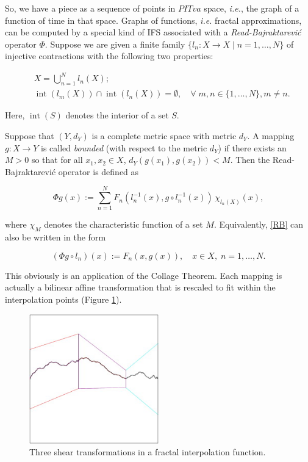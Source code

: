 \documentclass[english,11pt,letterpaper,onecolumn]{scrartcl}
\numberwithin{equation}{section}
\newcommand{\Int}{\mathop{\mathrm{int}}}
\newcommand{\be}{\begin{equation}}
\newcommand{\ee}{\end{equation}}
\begin{document}
So, we have a piece as a sequence of points in $PITva$ space, \textit{i.e.}, 
the graph of a function of time in that space. Graphs of functions, 
\textit{i.e.} fractal approximations, can be computed by a special kind of IFS 
associated with a \textit{Read-Bajraktarevi\'c} operator $\Phi$. Suppose we 
are given a finite family $\{l_n : X\to X \mid n = 1, \ldots, N\}$ of 
injective contractions with the following two properties: 

\begin{align}
&X = \bigcup_{n=1}^N l_n(X);\label{union}\\
&\Int (l_m(X))\cap \Int(l_n(X)) = \emptyset, \quad\forall\;m, n\in \{1,\ldots, 
N\}, m\neq n.\label{partition} 
\end{align}

\noindent Here, $\Int (S)$ denotes the interior of a set $S$.

Suppose that $(Y,d_Y)$ is a complete metric space with metric $d_Y$. A mapping 
$g:X\to Y$ is called \emph{bounded} (with respect to the metric $d_Y$) if 
there exists an $M> 0$ so that for all $x_1, x_2\in X$, $d_Y(g(x_1),g(x_2)) < 
M$. Then the Read-Bajraktarevi\'c operator is defined as

\be\label{RB}
\Phi g (x) := \sum\limits_{n=1}^N F_n (l_n^{-1} (x), g\circ l_n^{-1} 
(x))\,\chi_{l_n(X)}(x), 
\ee

\noindent where $\chi_M$ denotes the characteristic function of a set $M$. 
Equivalently, \eqref{RB} can also be written in the form

\be\label{3.3}
(\Phi g \circ l_n) (x) := F_n (x, g(x)),\quad x\in X, \;n = 1, \ldots, N. 
\ee


This obviously is an application of the Collage Theorem. Each mapping is 
actually a bilinear affine transformation that is rescaled 
to fit within the interpolation points (Figure \ref{fig:fif}).

    \begin{figure}
        \centerline{\includegraphics[width = 0.5\textwidth]{interp}}
        \caption{\label{fig:fif} Three shear transformations in 
a fractal interpolation function.\protect\footnotemark}
    \end{figure}
\end{document}
